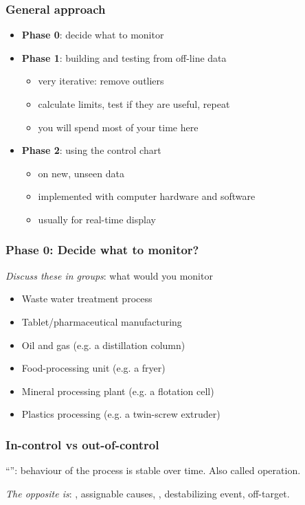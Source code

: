 \begin{frame}\frametitle{General approach}
	\begin{itemize}
		\item	\textbf{Phase 0}: decide what to monitor
		\item	\textbf{Phase 1}: building and testing from off-line data
		\begin{itemize}
			\item	very iterative: remove outliers
			\item	calculate limits, test if they are useful, repeat
			\item	you will spend most of your time here
		\end{itemize}
	\end{itemize}
	\begin{itemize}
		\item	\textbf{Phase 2}: using the control chart
		\begin{itemize}
			\item	on new, unseen data
			\item	implemented with computer hardware and software
			\item	usually for real-time display
		\end{itemize}
	\end{itemize}
\end{frame}

\begin{frame}\frametitle{Phase 0: Decide what to monitor?}

	\emph{Discuss these in groups}: what would you monitor
	\begin{itemize}
		\item	Waste water treatment process
		\item	Tablet/pharmaceutical manufacturing
		\item	Oil and gas (e.g. a distillation column)
		\item	Food-processing unit (e.g. a fryer)
		\item	Mineral processing plant (e.g. a flotation cell)
		\item	Plastics processing (e.g. a twin-screw extruder)
	\end{itemize}
\end{frame}

\begin{frame}\frametitle{In-control vs out-of-control}
	\begin{exampleblock}{}
		\begin{center}
			``{\color{purple}{In-control}}'': behaviour of the process is stable over time. Also called {} operation.
		\end{center}
	\end{exampleblock}
	\vspace{24pt}
	\emph{The opposite is}: {\color{purple}{out of control}}, assignable causes, {\color{purple}{special causes}}, destabilizing event, off-target.
\end{frame}

